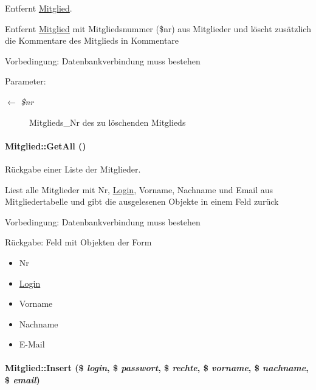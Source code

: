 Entfernt \hyperlink{classMitglied}{Mitglied}. 

Entfernt \hyperlink{classMitglied}{Mitglied} mit Mitgliedsnummer (\$nr) aus Mitglieder und löscht zusätzlich die Kommentare des Mitglieds in Kommentare \begin{Desc}
\item[Vorbedingung:]Datenbankverbindung muss bestehen \end{Desc}
\begin{Desc}
\item[Parameter:]
\begin{description}
\item[\mbox{$\leftarrow$} {\em \$nr}]Mitglieds\_\-Nr des zu löschenden Mitglieds\end{description}
\end{Desc}
\hypertarget{classMitglied_70ce63c9c9a7159966dc9e80a7f726a2}{
\paragraph[GetAll]{\setlength{\rightskip}{0pt plus 5cm}Mitglied::Get\-All ()}\hfill}
\label{classMitglied_70ce63c9c9a7159966dc9e80a7f726a2}


Rückgabe einer Liste der Mitglieder. 

Liest alle Mitglieder mit Nr, \hyperlink{classLogin}{Login}, Vorname, Nachname und Email aus Mitgliedertabelle und gibt die ausgelesenen Objekte in einem Feld zurück \begin{Desc}
\item[Vorbedingung:]Datenbankverbindung muss bestehen \end{Desc}
\begin{Desc}
\item[R\"{u}ckgabe:]Feld mit Objekten der Form\begin{itemize}
\item Nr\item \hyperlink{classLogin}{Login}\item Vorname\item Nachname\item E-Mail\end{itemize}
\end{Desc}
\hypertarget{classMitglied_a856527798258505adf9eb08b79fd9fc}{
\paragraph[Insert]{\setlength{\rightskip}{0pt plus 5cm}Mitglied::Insert (\$ {\em login}, \$ {\em passwort}, \$ {\em rechte}, \$ {\em vorname}, \$ {\em nachname}, \$ {\em email})}\hfill}
\label{classMitglied_a856527798258505adf9eb08b79fd9fc}


